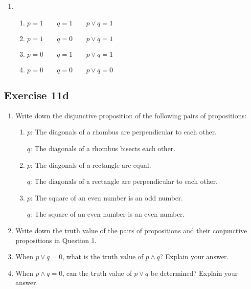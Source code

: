 \documentclass{report}
\begin{document}
\begin{enumerate}[label=\textbf{Sol.}, leftmargin=*]
    \item \begin{enumerate}[label=, leftmargin=*]
              \item $p = 1 \qquad q = 1 \qquad p \lor q = 1$
              \item $p = 1 \qquad q = 0 \qquad p \lor q = 1$
              \item $p = 0 \qquad q = 1 \qquad p \lor q = 1$
              \item $p = 0 \qquad q = 0 \qquad p \lor q = 0$
          \end{enumerate}
\end{enumerate}

\subsection*{Exercise 11d}
\begin{enumerate}[leftmargin=*]
    \item Write down the disjunctive proposition of the following pairs of propositions:
          \begin{enumerate}[label=(\alph*), leftmargin=*]
              \item $p$: The diagonals of a rhombus are perpendicular to each other.

                    $q$: The diagonals of a rhombus bisects each other.

              \item $p$: The diagonals of a rectangle are equal.

                    $q$: The diagonals of a rectangle are perpendicular to each other.

              \item $p$: The square of an even number is an odd number.

                    $q$: The square of an even number is an even number.
          \end{enumerate}

    \item Write down the truth value of the pairs of propositions and their conjunctive
          propositions in Question 1.

    \item When $p \lor q = 0$, what is the truth value of $p \land q$? Explain your
          answer.

    \item When $p \land q = 0$, can the truth value of $p \lor q$ be determined? Explain
          your answer.
\end{enumerate}
\end{document}
